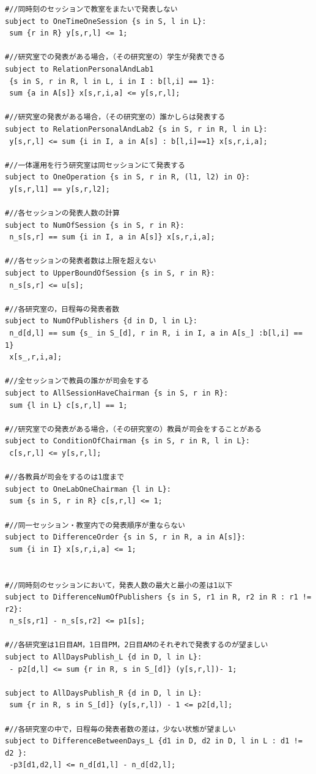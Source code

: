 \documentclass[a4paper,12pt,fleqn]{jarticle}
\begin{document}
\begin{verbatim}
#//同時刻のセッションで教室をまたいで発表しない
subject to OneTimeOneSession {s in S, l in L}:
 sum {r in R} y[s,r,l] <= 1;

#//研究室での発表がある場合，（その研究室の）学生が発表できる
subject to RelationPersonalAndLab1
 {s in S, r in R, l in L, i in I : b[l,i] == 1}:
 sum {a in A[s]} x[s,r,i,a] <= y[s,r,l];

#//研究室の発表がある場合，（その研究室の）誰かしらは発表する
subject to RelationPersonalAndLab2 {s in S, r in R, l in L}:
 y[s,r,l] <= sum {i in I, a in A[s] : b[l,i]==1} x[s,r,i,a];

#//一体運用を行う研究室は同セッションにて発表する
subject to OneOperation {s in S, r in R, (l1, l2) in O}:
 y[s,r,l1] == y[s,r,l2];

#//各セッションの発表人数の計算
subject to NumOfSession {s in S, r in R}:
 n_s[s,r] == sum {i in I, a in A[s]} x[s,r,i,a];

#//各セッションの発表者数は上限を超えない
subject to UpperBoundOfSession {s in S, r in R}:
 n_s[s,r] <= u[s];

#//各研究室の，日程毎の発表者数
subject to NumOfPublishers {d in D, l in L}:
 n_d[d,l] == sum {s_ in S_[d], r in R, i in I, a in A[s_] :b[l,i] == 1}
 x[s_,r,i,a];

#//全セッションで教員の誰かが司会をする
subject to AllSessionHaveChairman {s in S, r in R}:
 sum {l in L} c[s,r,l] == 1;

#//研究室での発表がある場合，（その研究室の）教員が司会をすることがある
subject to ConditionOfChairman {s in S, r in R, l in L}:
 c[s,r,l] <= y[s,r,l];

#//各教員が司会をするのは1度まで
subject to OneLabOneChairman {l in L}:
 sum {s in S, r in R} c[s,r,l] <= 1;

#//同一セッション・教室内での発表順序が重ならない
subject to DifferenceOrder {s in S, r in R, a in A[s]}:
 sum {i in I} x[s,r,i,a] <= 1;

	
#//同時刻のセッションにおいて，発表人数の最大と最小の差は1以下
subject to DifferenceNumOfPublishers {s in S, r1 in R, r2 in R : r1 != r2}:
 n_s[s,r1] - n_s[s,r2] <= p1[s];

#//各研究室は1日目AM，1日目PM，2日目AMのそれぞれで発表するのが望ましい
subject to AllDaysPublish_L {d in D, l in L}:
 - p2[d,l] <= sum {r in R, s in S_[d]} (y[s,r,l])- 1;

subject to AllDaysPublish_R {d in D, l in L}:
 sum {r in R, s in S_[d]} (y[s,r,l]) - 1 <= p2[d,l];

#//各研究室の中で，日程毎の発表者数の差は，少ない状態が望ましい
subject to DifferenceBetweenDays_L {d1 in D, d2 in D, l in L : d1 != d2 }:
 -p3[d1,d2,l] <= n_d[d1,l] - n_d[d2,l];


\end{verbatim}
\end{document}
